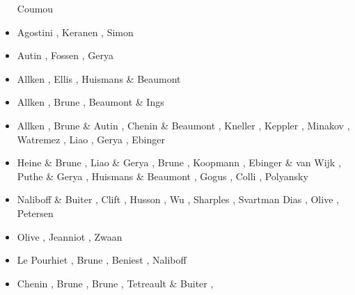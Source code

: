\begin{scriptsize}
\begin{itemize}
                         Coumou \etal \cite{codh08}
\item[\twothousandnine] Agostini \etal \cite{agcz09}, Keranen \etal \cite{kekj09},
                        Simon \etal \cite{sihb09}
\item[\twothousandten] Autin \etal \cite{aubh10}, Fossen \etal \cite{fosr10}, 
                       Gerya \cite{gerya2010}
\item[\twothousandeleven] Allken \etal \cite{alht11}, Ellis \etal \cite{ellw11},
                          Huismans \& Beaumont \cite{hube11}
\item[\twothousandtwelve] Allken \etal \cite{alht12}, Brune \etal \cite{brps12},
                          Beaumont \& Ings \cite{bein12}
\item[\twothousandthirteen] Allken \etal \cite{alhf13}, Brune \& Autin \cite{brau13},
                            Chenin \& Beaumont \cite{chbe13}, Kneller \etal \cite{knak13},
                            Keppler \etal \cite{kern13}, Minakov \etal \cite{mipf13},
                            Watremez \etal \cite{wabd13}, Liao \etal \cite{ligw13}, 
                            Gerya \cite{gery13c,gery13}, Ebinger \etal \cite{ebvk13}
\item[\twothousandfourteen] Heine \& Brune \cite{hebr14}, Liao \& Gerya \cite{lige14,lige14b},
                            Brune \cite{brun14}, Koopmann \etal \cite{kobf14},
                            Ebinger \& van Wijk \cite{ebva14}, Puthe \& Gerya \cite{puge14},
                            Huismans \& Beaumont \cite{hube14},
                            Gogus \cite{gogu14}, 
                            Colli \etal \cite{cosb14}, Polyansky \etal \cite{pokb14}
\item[\twothousandfifteen] Naliboff \& Buiter \cite{nabu15}, Clift \etal \cite{clbq15}, 
                     Husson \etal \cite{huyb15}, Wu \etal \cite{wulc15},
                     Sharples \etal \cite{shmj15}, Svartman Dias \etal \cite{svlh15},
                     Olive \etal \cite{olbi15}, Petersen \etal \cite{pean15}
\item[\twothousandsixteen] Olive \etal \cite{olbm16}, Jeanniot \etal \cite{jekm16},
                     Zwaan \etal \cite{zwsn16}
\item[\twothousandseventeen] Le Pourhiet \etal \cite{lemh17}, Brune \etal \cite{brcr17},
                       Beniest \etal \cite{bekb17}, Naliboff \etal \cite{nabp17}
\item[\twothousandeighteen] Chenin \etal \cite{chsm18}, Brune \etal \cite{brwm18},
                      Brune \cite{brun18}, Tetreault \& Buiter \cite{tebu18},

\end{itemize}
\end{scriptsize}

